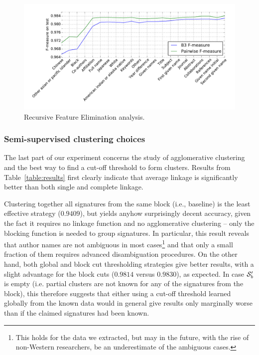 \documentclass[runningheads,a4paper]{llncs}
\makeatletter
\newcommand*{\ie}{i.e.\@\xspace}
\newcommand{\longpage}{\enlargethispage{\baselineskip}}
\makeatother
\begin{document}
\begin{figure}
	\centering
	\caption{Recursive Feature Elimination analysis. }
	\label{fig:rfe}
	\includegraphics[width=\linewidth]{fig-rfe.pdf}
\end{figure}


\subsubsection{Semi-supervised clustering choices}
\label{choices:clustering}
The last part of our experiment concerns
the study of agglomerative clustering and the best way to find a cut-off
threshold to form clusters. Results from Table~\ref{table:results}
first clearly indicate that average linkage is significantly better than
both single and complete linkage.

\longpage

Clustering together all signatures from the same block (\ie, baseline) is the least effective
strategy ($0.9409$), but yields anyhow surprisingly decent accuracy, given the
fact it requires no linkage function and no agglomerative clustering -- only the blocking
function is needed to group signatures. In particular, this result reveals
that author names are not ambiguous in most cases\footnote{This holds for the
data we extracted, but may in the future, with the rise of non-Western
researchers, be an underestimate of the ambiguous cases.} and that only a small
fraction of them requires advanced disambiguation procedures. On the other
hand, both global and block cut thresholding strategies give better results,
with a slight advantage for the block cuts ($0.9814$ versus $0.9830$), as expected.
In case ${\cal S}^\prime_b$ is empty (\ie partial clusters are not known for any of the signatures from the
block), this therefore suggests that either using
a cut-off threshold learned globally from the known data would in general give results only
marginally worse than if the claimed signatures had been
known.
\end{document}
